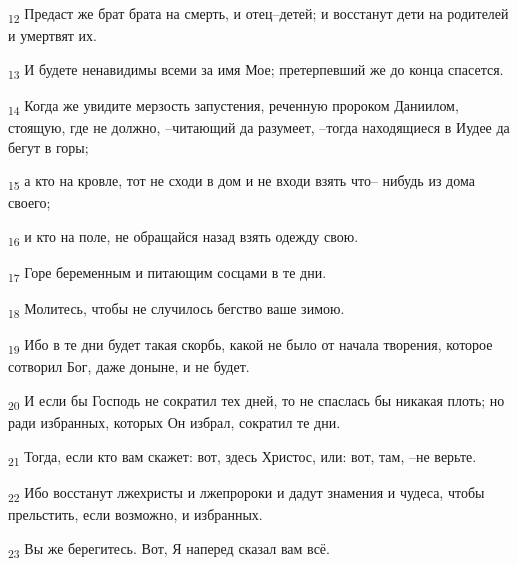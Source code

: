 \begin{tcolorbox}
\textsubscript{12} Предаст же брат брата на смерть, и отец--детей; и восстанут дети на родителей и умертвят их.
\end{tcolorbox}
\begin{tcolorbox}
\textsubscript{13} И будете ненавидимы всеми за имя Мое; претерпевший же до конца спасется.
\end{tcolorbox}
\begin{tcolorbox}
\textsubscript{14} Когда же увидите мерзость запустения, реченную пророком Даниилом, стоящую, где не должно, --читающий да разумеет, --тогда находящиеся в Иудее да бегут в горы;
\end{tcolorbox}
\begin{tcolorbox}
\textsubscript{15} а кто на кровле, тот не сходи в дом и не входи взять что-- нибудь из дома своего;
\end{tcolorbox}
\begin{tcolorbox}
\textsubscript{16} и кто на поле, не обращайся назад взять одежду свою.
\end{tcolorbox}
\begin{tcolorbox}
\textsubscript{17} Горе беременным и питающим сосцами в те дни.
\end{tcolorbox}
\begin{tcolorbox}
\textsubscript{18} Молитесь, чтобы не случилось бегство ваше зимою.
\end{tcolorbox}
\begin{tcolorbox}
\textsubscript{19} Ибо в те дни будет такая скорбь, какой не было от начала творения, которое сотворил Бог, даже доныне, и не будет.
\end{tcolorbox}
\begin{tcolorbox}
\textsubscript{20} И если бы Господь не сократил тех дней, то не спаслась бы никакая плоть; но ради избранных, которых Он избрал, сократил те дни.
\end{tcolorbox}
\begin{tcolorbox}
\textsubscript{21} Тогда, если кто вам скажет: вот, здесь Христос, или: вот, там, --не верьте.
\end{tcolorbox}
\begin{tcolorbox}
\textsubscript{22} Ибо восстанут лжехристы и лжепророки и дадут знамения и чудеса, чтобы прельстить, если возможно, и избранных.
\end{tcolorbox}
\begin{tcolorbox}
\textsubscript{23} Вы же берегитесь. Вот, Я наперед сказал вам всё.
\end{tcolorbox}
